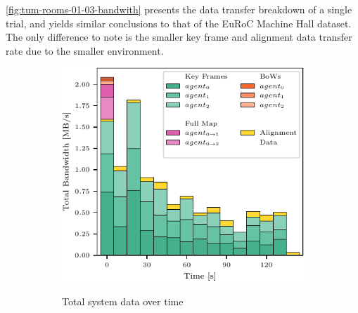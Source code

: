 \autoref{fig:tum-rooms-01-03-bandwith} presents the data transfer breakdown of a single trial, and yields similar conclusions to that of the EuRoC Machine Hall dataset. The only difference to note is the smaller key frame and alignment data transfer rate due to the smaller environment.

\begin{figure}[h]
    \centering
    \begin{subfigure}[b]{0.55\linewidth}
        \centering
         {
            \includegraphics[width=\linewidth, valign=t]{figures/apr11_tum_room_trajectory_a_bandwith.pdf}
        }
        \caption{Total system data over time}
    \end{subfigure}%
    ~
    \begin{subfigure}[b]{0.45\linewidth}
        \flushright
\end{subfigure}
\end{figure}
